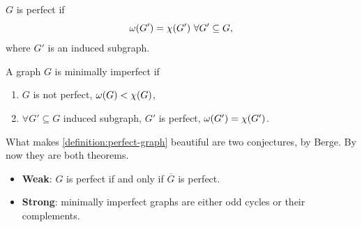\begin{definition} \label{definition:perfect-graph}
	$G$ is perfect if
	\begin{equation*}
		\omega(G') = \chrom{G'}\ \forall G' \subseteq G,
	\end{equation*}
	where $G'$ is an induced subgraph.
\end{definition}

\begin{definition}
A graph $G$ is minimally imperfect if
	\begin{enumerate}
		\item $G$ is not perfect, \ie $\omega(G) < \chi(G)$,
		\item $\forall G' \subseteq G$ induced subgraph, $G'$ is perfect, \ie $\omega(G') = \chi(G')$.
	\end{enumerate}
\end{definition}

What makes \cref{definition:perfect-graph} beautiful are two conjectures, by Berge.
By now they are both theorems.
\begin{itemize}
	\item \textbf{Weak}: $G$ is perfect if and only if $\overline{G}$ is perfect.
	\item \textbf{Strong}: minimally imperfect graphs are either odd cycles or their complements.
\end{itemize}




